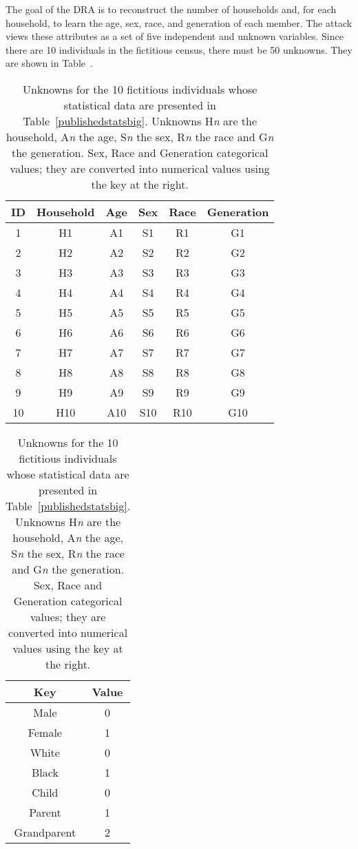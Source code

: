 \documentclass[runningheads]{llncs}
\begin{document}
The goal of the DRA is to reconstruct the number of households and,
for each household, to learn the age, sex, race, and generation of
each member. The attack views these attributes as a set of five
independent and unknown variables. Since there are 10 individuals in
the fictitious census, there must be 50 unknowns. They are shown in
Table~\label{unknownssmall}. 

\begin{table}
\begin{minipage}[t]{3in}
\begin{tabular}{cccccc}
ID & Household & Age & Sex & Race & Generation \\
\hline
\hline
1 & H1 & A1 & S1 & R1 & G1  \\
\hline
2 & H2 & A2 & S2 & R2 & G2  \\
\hline
3 & H3 & A3 & S3 & R3 & G3  \\
\hline
4 & H4 & A4 & S4 & R4 & G4  \\
\hline
5 & H5 & A5 & S5 & R5 & G5  \\
\hline
6 & H6 & A6 & S6 & R6 & G6  \\
\hline
7 & H7 & A7 & S7 & R7 & G7  \\
\hline
8 & H8 & A8 & S8 & R8 & G8  \\
\hline
9 & H9 & A9 & S9 & R9 & G9  \\
\hline
10 & H10 & A10 & S10 & R10 & G10  \\
\hline
\hline
\end{tabular}
\end{minipage}
\begin{minipage}[t]{1in}
\begin{tabular}{c|c}
Key & Value \\
\hline
Male & 0 \\
Female & 1 \\
\hline
White & 0 \\
Black & 1 \\
\hline
Child & 0 \\
Parent & 1 \\
Grandparent & 2 \\
\hline
\end{tabular}
\end{minipage}
\caption{Unknowns for the 10 fictitious individuals whose statistical
  data are presented in Table~\ref{publishedstatsbig}. Unknowns
  H\textit{n} are the household, A\textit{n} the age, S\textit{n} the
  sex, R\textit{n} the race and G\textit{n} the generation. Sex, Race
  and Generation categorical values; they are converted into numerical
  values using the key at the right.}\label{unknownssmall}
\end{table}
\end{document}
